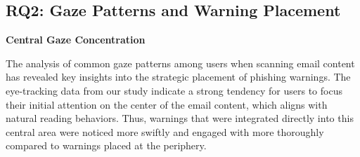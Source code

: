 \documentclass[
  a4paper,  %
  twoside,  %
  bibliography=totoc,
  headsepline,
  cleardoublepage=empty,
  parskip=half,
  draft=false
]{scrbook}
\begin{document}


\subsection{RQ2: Gaze Patterns and Warning Placement}
\textbf{Central Gaze Concentration} 

The analysis of common gaze patterns among users when scanning email content has revealed key insights into the strategic placement of phishing warnings. The eye-tracking data from our study indicate a strong tendency for users to focus their initial attention on the center of the email content, which aligns with natural reading behaviors. Thus, warnings that were integrated directly into this central area were noticed more swiftly and engaged with more thoroughly compared to warnings placed at the periphery. 
\end{document}
